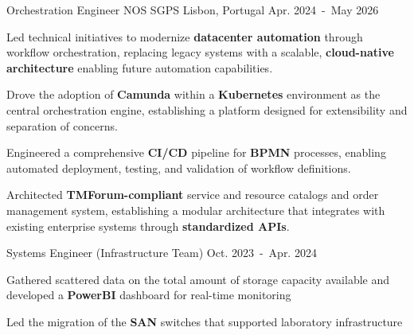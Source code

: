 \begin{cventries}

\cventry
  {Orchestration Engineer} %
  {NOS SGPS} %
  {Lisbon, Portugal} %
  {Apr. 2024~-~May 2026} %
  {
    \begin{cvitems}
      \item {Led technical initiatives to modernize \textbf{datacenter automation} through workflow orchestration, replacing legacy systems with a scalable, \textbf{cloud-native architecture} enabling future automation capabilities.}
      \item {Drove the adoption of \textbf{Camunda} within a \textbf{Kubernetes} environment as the central orchestration engine, establishing a platform designed for extensibility and separation of concerns.}
      \item {Engineered a comprehensive \textbf{CI/CD} pipeline for \textbf{BPMN} processes, enabling automated deployment, testing, and validation of workflow definitions.}
      \item {Architected \textbf{TMForum-compliant} service and resource catalogs and order management system, establishing a modular architecture that integrates with existing enterprise systems through \textbf{standardized APIs}.}
    \end{cvitems}
  }


\cventry
  {Systems Engineer (Infrastructure Team)} %
  {} %
  {} %
  {Oct. 2023~-~Apr. 2024} %
  {
    \begin{cvitems}
      \item {Gathered scattered data on the total amount of storage capacity available and developed a \textbf{PowerBI} dashboard for real-time monitoring}
      \item {Led the migration of the \textbf{SAN} switches that supported laboratory infrastructure}
    \end{cvitems}
  }

\vspace{1mm}


\end{cventries}
